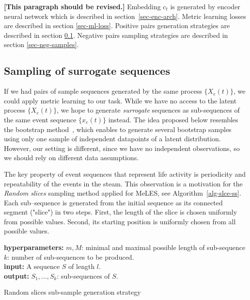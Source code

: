 \documentclass{article}
\newcommand{\nt}[1]{{\bf [#1]}}
\begin{document}
\nt{This paragraph should be revised.}
Embedding $c_t$ is generated by encoder neural network which is described in section~\ref{sec-enc-arch}. Metric learning losses are described in section \ref{sec-ml-loss}. Positive pairs generation strategies are described in section \ref{sec-pos-pairs}. Negative pairs sampling strategies are described in section \ref{sec-neg-samples}. 


\subsection{Sampling of surrogate sequences} \label{sec-pos-pairs}

If we had pairs of sample sequences generated by the same process $\{X_e(t)\}$, we could apply metric learning to our task. While we have no access to the latent process $\{X_e(t)\}$, we hope to generate \textit{surrogate} sequences as sub-sequences of the same event sequence $\{x_e(t)\}$ instead. The idea proposed below resembles the bootstrap method~\cite{Efron1994Bootstrap}, which enables to generate several bootstrap samples using only one sample of independent datapoints of a latent distribution. However, our setting is different, since we have no independent observations, so we should rely on different data assumptions.

The key property of event sequences that represent life activity is periodicity and repeatability of the events in the steam. This observation is a motivation for the \textit{Random slices} sampling method applied for MeLES, see Algorithm~\ref{alg-slce-ss}. Each sub--sequence is generated from the initial sequence as its connected segment ("slice") in two steps. First, the length of the slice is chosen uniformly from possible values. Second, its starting position is uniformly chosen from all possible values.

\begin{algorithm}
\SetAlgoLined
\textbf{hyperparameters:} $m, M$: minimal and maximal possible length of sub-sequence\\ $k$: number of sub-sequences to be produced. \\
\textbf{input:} A sequence $S$ of length $l$. \\
\textbf{output:} $S_1,...,S_k$: sub-sequences of $S$. \\

\BlankLine
 
\caption{Random slices sub-sample generation strategy}
\label{alg-slce-ss}
\end{algorithm}
\end{document}
